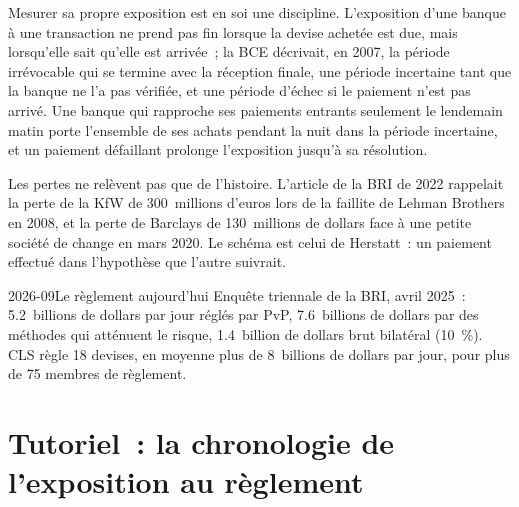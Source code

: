 Mesurer sa propre exposition est en soi une discipline. L'exposition d'une banque à une transaction
ne prend pas fin lorsque la devise achetée est due, mais lorsqu'elle sait qu'elle est arrivée~;
la BCE décrivait, en 2007, la période irrévocable qui se termine avec la réception finale, une
période incertaine tant que la banque ne l'a pas vérifiée, et une
période d'échec si le paiement n'est pas arrivé. Une banque qui rapproche ses paiements entrants seulement le
lendemain matin porte l'ensemble de ses achats pendant la nuit dans la période incertaine, et un
paiement défaillant prolonge l'exposition jusqu'à sa résolution.

Les pertes ne relèvent pas que de l'histoire. L'article de la BRI de 2022 rappelait la perte de la KfW de
300~millions d'euros lors de la faillite de Lehman Brothers en 2008, et la perte de Barclays de 130~millions
de dollars face à une petite société de change en mars 2020. Le schéma est celui de Herstatt~: un
paiement effectué dans l'hypothèse que l'autre suivrait.

\begin{dated}{2026-09}{Le règlement aujourd'hui}\label{dat:m2:settlement-risk:today}
Enquête triennale de la BRI, avril 2025~: 5.2~billions de dollars par jour réglés par PvP, 7.6~billions de dollars par des
méthodes qui atténuent le risque, 1.4~billion de dollars brut bilatéral (10~\%).
CLS règle 18 devises, en moyenne plus de 8~billions de dollars par jour, pour plus de
75 membres de règlement.
\end{dated}

\section{Tutoriel~: la chronologie de l'exposition au règlement}\label{tut:m2:settlement-risk:timeline}

